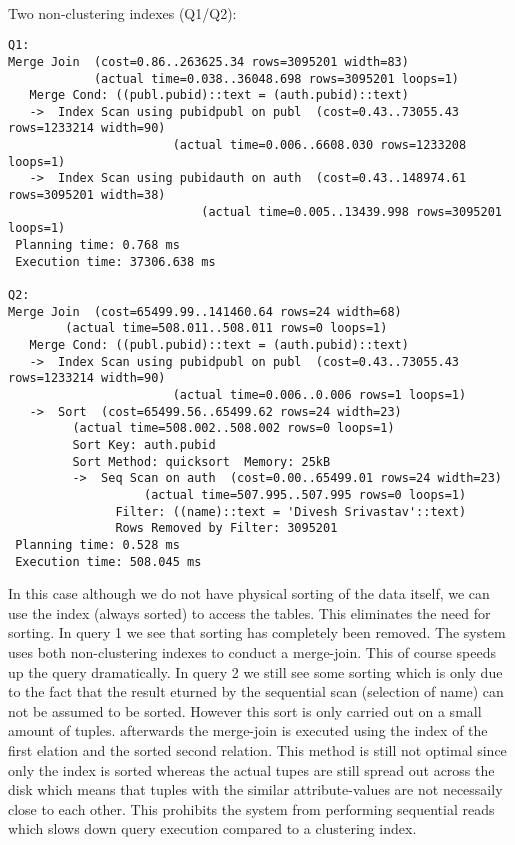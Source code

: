 \documentclass[11pt]{scrartcl}
\begin{document}
\\
\noindent Two non-clustering indexes (Q1/Q2):
{\small
\begin{verbatim}
Q1:
Merge Join  (cost=0.86..263625.34 rows=3095201 width=83)
            (actual time=0.038..36048.698 rows=3095201 loops=1)
   Merge Cond: ((publ.pubid)::text = (auth.pubid)::text)
   ->  Index Scan using pubidpubl on publ  (cost=0.43..73055.43 rows=1233214 width=90)
					   (actual time=0.006..6608.030 rows=1233208 loops=1)
   ->  Index Scan using pubidauth on auth  (cost=0.43..148974.61 rows=3095201 width=38)
				           (actual time=0.005..13439.998 rows=3095201 loops=1)
 Planning time: 0.768 ms
 Execution time: 37306.638 ms

Q2:
Merge Join  (cost=65499.99..141460.64 rows=24 width=68)
	    (actual time=508.011..508.011 rows=0 loops=1)
   Merge Cond: ((publ.pubid)::text = (auth.pubid)::text)
   ->  Index Scan using pubidpubl on publ  (cost=0.43..73055.43 rows=1233214 width=90)
					   (actual time=0.006..0.006 rows=1 loops=1)
   ->  Sort  (cost=65499.56..65499.62 rows=24 width=23)
	     (actual time=508.002..508.002 rows=0 loops=1)
         Sort Key: auth.pubid
         Sort Method: quicksort  Memory: 25kB
         ->  Seq Scan on auth  (cost=0.00..65499.01 rows=24 width=23)
			       (actual time=507.995..507.995 rows=0 loops=1)
               Filter: ((name)::text = 'Divesh Srivastav'::text)
               Rows Removed by Filter: 3095201
 Planning time: 0.528 ms
 Execution time: 508.045 ms
\end{verbatim}
In this case although we do not have physical sorting of the data itself, we can use the index (always sorted) to access the tables. This eliminates the need for sorting.
In query 1 we see that sorting has completely been removed. The system uses both non-clustering indexes to conduct a merge-join. This of course speeds up the query dramatically.
In query 2 we still see some sorting which is only due to the fact that the result eturned by the sequential scan (selection of name) can not be assumed to be sorted. However this sort
is only carried out on a small amount of tuples. afterwards the merge-join is executed using the index of the first elation and the sorted second relation.
This method is still not optimal since only the index is sorted whereas the actual tupes are still spread out across the disk which means that tuples with the similar attribute-values are not necessaily
close to each other. This prohibits the system from performing sequential reads which slows down query execution compared to a clustering index.
}
\end{document}
